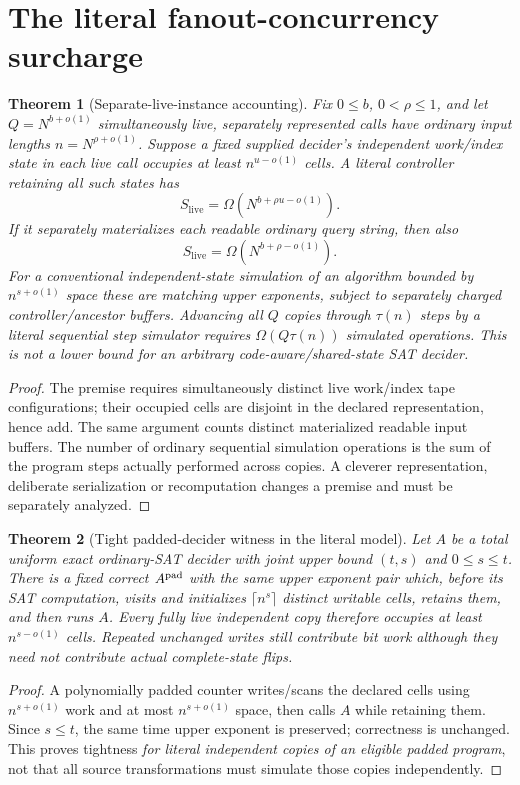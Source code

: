 \documentclass[11pt]{article}
\newtheorem{theorem}{Theorem}
\begin{document}
\section{The literal fanout-concurrency surcharge}
\begin{theorem}[Separate-live-instance accounting]
Fix $0\le b$, $0<\rho\le1$, and let $Q=N^{b+o(1)}$ \emph{simultaneously live, separately represented} calls have ordinary input lengths $n=N^{\rho+o(1)}$. Suppose a fixed supplied decider's independent work/index state in each live call occupies at least $n^{u-o(1)}$ cells. A literal controller retaining all such states has
\[
\boxed{S_{\mathrm{live}}=\Omega(N^{b+\rho u-o(1)})}.
\]
If it separately materializes each readable ordinary query string, then also
\[
\boxed{S_{\mathrm{live}}=\Omega(N^{b+\rho-o(1)})}.
\]
For a conventional independent-state simulation of an algorithm bounded by $n^{s+o(1)}$ space these are matching upper exponents, subject to separately charged controller/ancestor buffers. Advancing all $Q$ copies through $\tau(n)$ steps by a \emph{literal sequential step simulator} requires $\Omega(Q\tau(n))$ simulated operations. This is not a lower bound for an arbitrary code-aware/shared-state SAT decider.
\end{theorem}
\begin{proof}
The premise requires simultaneously distinct live work/index tape configurations; their occupied cells are disjoint in the declared representation, hence add. The same argument counts distinct materialized readable input buffers. The number of ordinary sequential simulation operations is the sum of the program steps actually performed across copies. A cleverer representation, deliberate serialization or recomputation changes a premise and must be separately analyzed. \end{proof}

\begin{theorem}[Tight padded-decider witness in the literal model]
Let $A$ be a total uniform exact ordinary-SAT decider with joint upper bound $(t,s)$ and $0\le s\le t$. There is a fixed correct $A^{\rm pad}$ with the same upper exponent pair which, before its SAT computation, visits and initializes $\lceil n^s\rceil$ distinct writable cells, retains them, and then runs $A$. Every fully live independent copy therefore occupies at least $n^{s-o(1)}$ cells. Repeated unchanged writes still contribute bit work although they need not contribute actual complete-state flips.
\end{theorem}
\begin{proof}
A polynomially padded counter writes/scans the declared cells using $n^{s+o(1)}$ work and at most $n^{s+o(1)}$ space, then calls $A$ while retaining them. Since $s\le t$, the same time upper exponent is preserved; correctness is unchanged. This proves tightness \emph{for literal independent copies of an eligible padded program}, not that all source transformations must simulate those copies independently. \end{proof}
\end{document}
